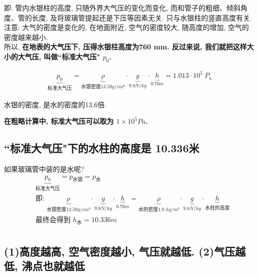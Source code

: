 \documentclass[UTF8]{ctexart}
\begin{document}
	即: 管内水银柱的高度, 只随外界大气压的变化而变化, 而和管子的粗细、倾斜角度、管的长度, 及将玻璃管提起还是下压等因素无关. 只与水银柱的竖直高度有关. \\
	
	注意: 大气的密度是变化的, 在地面附近, 空气的密度较大, 随高度的增加, 空气的密度越来越小. \\
	
	所以, \textbf{在地表的大气压下, 压得水银柱高度为760 mm. 反过来说, 我们就把这样大小的大气压, 叫做``标准大气压" $p_0$.}
	
	\begin{align*}
		\boxed{
			\underset{\text{标准大气压}}{\underbrace{p_0}}=\underset{\text{水银密度}13.59g/cm³}{\underbrace{\rho }}\cdot \underset{9.8N/kg}{\underbrace{g}}\cdot \underset{0.76m}{\underbrace{h}}=1.013\cdot 10^5\ P_a			
		}
	\end{align*}
	
	水银的密度, 是水的密度的13.6倍. 
	
	\textbf{在粗略计算中, 标准大气压可以取为 $1×10^5 Pa$.}
		
	\vspace{1em} 
	
	
	
	\subsection{``标准大气压"下的水柱的高度是 10.336米}
	
	如果玻璃管中装的是水呢?	
	\begin{align*}  %
	& \underset{\text{标准大气压}}{\underbrace{p_0}}=p_{\text{水银}}=p_{\text{水}}\\
	& \text{即:\ }\underset{\text{水银密度}13.59g/cm³}{\underbrace{\rho }}\cdot \underset{9.8N/kg}{\underbrace{g}}\cdot \underset{0.76m}{\underbrace{h}}=\underset{\text{水的密度1.0\ }kg/m³}{\underbrace{\rho }}\cdot \underset{9.8N/kg}{\underbrace{g}}\cdot \underset{\text{水柱的高度}}{\underbrace{h}}\\
	& \text{最终会得到\ }h_{\text{水}}=10.336m\\ 
	\end{align*}
		
	\vspace{1em} 
	
	
	
	\subsection{(1)高度越高, 空气密度越小, 气压就越低. (2)气压越低, 沸点也就越低}
	
\end{document}
